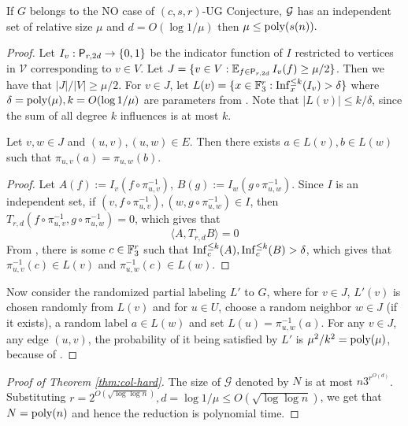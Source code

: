 \begin{lemma}[Soundness]\label{lem:soundness} 
If $G$ belongs to the NO case of
$(c,s,r)$-UG Conjecture, $\cal G$ has an independent set of relative size $\mu$
and $d= O(\log 1/\mu)$ then $ \mu \leq \poly(s(n)).$ 
\end{lemma} 
\begin{proof}
Let $I_v:\Pe_{r,2d} \rightarrow \{0,1\}$ be the indicator function of $I$
restricted to vertices in $\mathcal V$ corresponding to $v\in V$. Let $J=\{v \in
V: \E_{f \in \Pe_{r,2d}} I_v(f) \geq \mu/2\}$. Then we have that $|J|/|V| \geq
\mu/2$. For $v\in J$, let $L(v) = \{x \in \F_3^{r}: \Inf_x^{\leq k}(I_v) >
\delta \}$ where $\delta = \poly(\mu), k = O(\log 1/\mu)$ are parameters from
. Note that $|L(v)| \leq k/\delta$, since the sum
of all degree $k$ influences is at most $k$. 
\begin{claim}\label{claim:sound}
Let $v,w \in J$ and $(u,v),(u,w) \in E$. Then there exists $a \in L(v), b \in
L(w)$ such that $\pi_{u,v}(a)= \pi_{u,w}(b)$. 
\end{claim} 
\begin{proof}
 Let
$A(f):= I_v(f\circ\pi^{-1}_{u,v})$, $B(g):= I_w(g\circ \pi^{-1}_{u,w})$. Since
$I$ is an independent set, if $(v,f\circ\pi^{-1}_{u,v}),
(w,g\circ\pi^{-1}_{u,w}) \in I$, then
$T_{r,d}(f\circ\pi^{-1}_{u,v},g\circ\pi^{-1}_{u,w}) =0$, which gives that
\begin{equation} 
\langle A, T_{r,d} B\rangle = 0 
\end{equation} 
From
, there is some $c \in \F_3^r$ such that
$\Inf^{\leq k}_c( A),\Inf^{\leq k}_c(B) > \delta$, which gives that
$\pi_{u,v}^{-1}(c) \in L(v)$ and $\pi_{u,w}^{-1}(c) \in L(w)$. 
\end{proof} 
Now
consider the randomized partial labeling $L'$ to $G$, where for $v \in J$,
$L'(v)$ is chosen randomly from $L(v)$ and for $u\in U$, choose a random
neighbor $w \in J$ (if it exists), a random label $a \in L(w)$ and set $L(u)=
\pi_{u,w}^{-1}(a)$. For any $v \in J$, any edge $(u,v)$, the probability of it
being satisfied by $L'$ is $\mu^2/k^2 = \poly(\mu)$, because of
.

\end{proof}

\begin{proof}[Proof of Theorem \ref{thm:col-hard}] 
The size of $\mathcal G$
denoted by $N$ is at most $ n 3^{r^{O(d)}}$. Substituting $r= 2^{O(\sqrt{\log
\log n})}, d = \log 1/\mu \leq O(\sqrt{\log \log n})$, we get that $N =
\poly(n)$ and hence the reduction is polynomial time. 
\end{proof}
